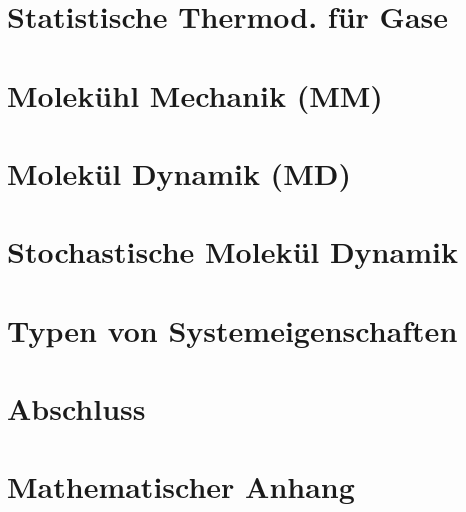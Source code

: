 \documentclass[fourColumns]{formularyETH/formularyETH}
\begin{document}
\section{Statistische Thermod. für Gase}
\label{sec:statgase}

\newpage
\section{Molekühl Mechanik (MM)}
\label{sec:MM}

\newpage
\section{Molekül Dynamik (MD)}
\label{sec:MD}

\newpage
\section{Stochastische Molekül Dynamik}

\section{Typen von Systemeigenschaften}

\section{Abschluss}

\newpage
\section{Mathematischer Anhang}


% 
  
\end{document}
